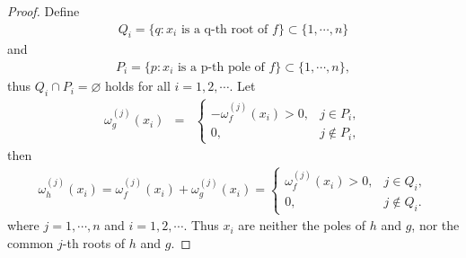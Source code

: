 \documentclass{article}
\begin{document}
\begin{proof}
    Define
    \begin{eqnarray*}
        Q_{i}=\{q: x_{i}\text{ is a q-th root of } f\}\subset \{1, \cdots, n\}
    \end{eqnarray*}
    and
    \begin{eqnarray*}
        P_{i}=\{p: x_{i}\text{ is a p-th pole of } f\}\subset \{1, \cdots, n\},
    \end{eqnarray*} 
    thus $Q_{i}\cap P_{i}=\varnothing$ holds for all $i=1, 2, \cdots$. Let
    \begin{eqnarray}\label{2a33}
        \omega_{g}^{(j)}(x_{i})&=& \left\{\begin{array}{ll}
         -\omega_{f}^{(j)}(x_{i})>0, & j\in P_{i},\\
         0, & j\notin P_{i},
         \end{array}\right.
    \end{eqnarray}
    then
    \begin{eqnarray*}
        \omega_{h}^{(j)}(x_{i})=\omega_{f}^{(j)}(x_{i})+\omega_{g}^{(j)}(x_{i})=\left\{\begin{array}{ll}
         \omega_{f}^{(j)}(x_{i})>0, & j\in Q_{i},\\
         0, & j\notin Q_{i}.
         \end{array}\right.
    \end{eqnarray*}
     where $j=1, \cdots, n$ and $i=1, 2, \cdots$. Thus $x_{i}$ are neither the poles of $h$ and $g$, nor the common $j$-th roots of $h$ and $g$. 
     

\end{proof}
\end{document}

